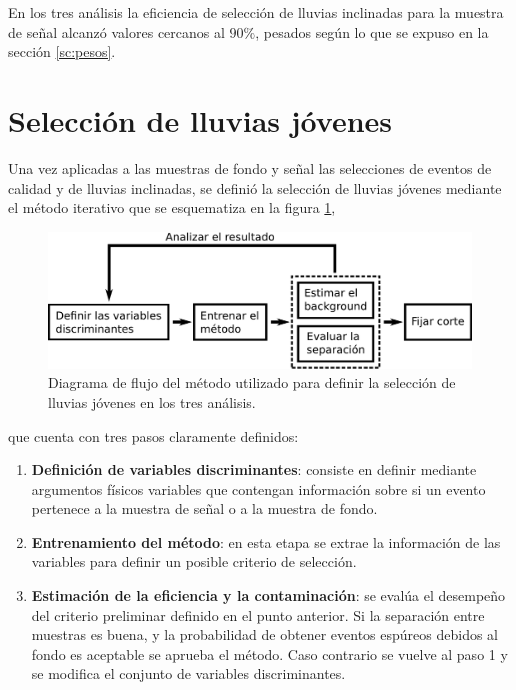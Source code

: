 		En los tres análisis la eficiencia de selección de lluvias inclinadas para la muestra de señal alcanz\'o valores cercanos al $90\%$, pesados según lo que se expuso en la sección \ref{sc:pesos}.
		
\section{Selecci\'on de lluvias j\'ovenes}
\label{sc:selNu}
	
	Una vez aplicadas a las muestras de fondo y señal las selecciones de eventos de calidad y de lluvias inclinadas, se definió la selección de lluvias jóvenes mediante el método iterativo que se esquematiza en la figura \ref{fig:entrenamiento},
	\begin{figure}[ht!]
		\begin{center}
		\includegraphics[width=1.0\textwidth]{fig/seleccionAuger/entrenamiento}
		\caption{Diagrama de flujo del método utilizado para definir la selección de lluvias jóvenes en los tres análisis.}
		\label{fig:entrenamiento}
		\end{center}
	\end{figure}
	que cuenta con tres pasos claramente definidos:
	\begin{enumerate}
	 \item \textbf{Definición de variables discriminantes}: consiste en definir mediante argumentos físicos variables que contengan información sobre si un evento pertenece a la muestra de señal o a la muestra de fondo.
	 \item \textbf{Entrenamiento del método}: en esta etapa se extrae la información de las variables para definir un posible criterio de selección. 
	 \item \textbf{Estimación de la eficiencia y la contaminación}: se eval\'ua el desempe\~no del criterio preliminar definido en el punto anterior. Si la separación entre muestras es buena, y la probabilidad de obtener eventos espúreos debidos al fondo es aceptable se aprueba el método. Caso contrario se vuelve al paso 1 y se modifica el conjunto de variables discriminantes.
	\end{enumerate}
